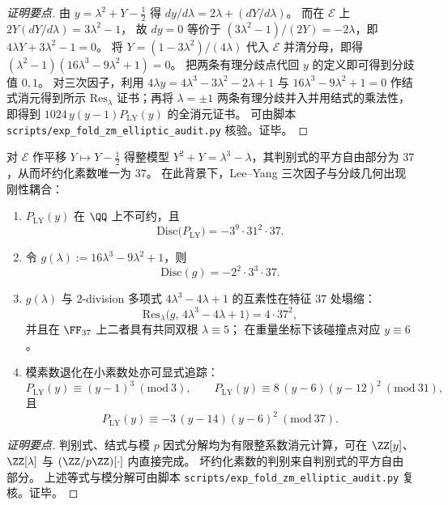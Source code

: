 \begin{proof}[证明要点]
由 \(y=\lambda^{2}+Y-\tfrac12\) 得
\(
dy/d\lambda=2\lambda+(dY/d\lambda)
\)。
而在 \(\mathcal{E}\) 上 \(2Y(dY/d\lambda)=3\lambda^{2}-1\)，
故 \(dy=0\) 等价于 \((3\lambda^{2}-1)/(2Y)=-2\lambda\)，即 \(4\lambda Y+3\lambda^{2}-1=0\)。
将 \(Y=(1-3\lambda^{2})/(4\lambda)\) 代入 \(\mathcal{E}\) 并清分母，即得
\(
(\lambda^{2}-1)(16\lambda^{3}-9\lambda^{2}+1)=0
\)。
把两条有理分歧点代回 \(y\) 的定义即可得到分歧值 \(0,1\)。
对三次因子，利用 \(4\lambda y=4\lambda^{3}-3\lambda^{2}-2\lambda+1\) 与 \(16\lambda^{3}-9\lambda^{2}+1=0\) 作结式消元得到所示 \(\mathrm{Res}_{\lambda}\) 证书；再将 \(\lambda=\pm 1\) 两条有理分歧并入并用结式的乘法性，即得到 \(1024\,y(y-1)P_{\mathrm{LY}}(y)\) 的全消元证书。
可由脚本 \texttt{scripts/exp\_fold\_zm\_elliptic\_audit.py} 核验。证毕。
\end{proof}



\begin{conclusion}\label{con:xi-terminal-zm-leyang-discriminant-bad-reduction-37}
对 \(\mathcal{E}\) 作平移 \(Y\mapsto Y-\tfrac12\) 得整模型
\(
Y^{2}+Y=\lambda^{3}-\lambda
\)，其判别式的平方自由部分为 \(37\)，从而坏约化素数唯一为 \(37\)。
在此背景下，Lee--Yang 三次因子与分歧几何出现刚性耦合：
\begin{enumerate}
  \item \(P_{\mathrm{LY}}(y)\) 在 \(\QQ\) 上不可约，且
  \[
  \mathrm{Disc}\bigl(P_{\mathrm{LY}}\bigr)=-3^{9}\cdot 31^{2}\cdot 37.
  \]
  \item 令 \(g(\lambda):=16\lambda^{3}-9\lambda^{2}+1\)，则
  \[
  \mathrm{Disc}(g)=-2^{2}\cdot 3^{3}\cdot 37.
  \]
  \item \(g(\lambda)\) 与 \(2\)-division 多项式 \(4\lambda^{3}-4\lambda+1\) 的互素性在特征 \(37\) 处塌缩：
  \[
  \mathrm{Res}_{\lambda}\bigl(g,\,4\lambda^{3}-4\lambda+1\bigr)=4\cdot 37^{2},
  \]
  并且在 \(\FF_{37}\) 上二者具有共同双根 \(\lambda\equiv 5\)；
  在重量坐标下该碰撞点对应 \(y\equiv 6\)。
  \item 模素数退化在小素数处亦可显式追踪：
  \[
  P_{\mathrm{LY}}(y)\equiv (y-1)^{3}\ (\mathrm{mod}\ 3),\qquad
  P_{\mathrm{LY}}(y)\equiv 8\,(y-6)(y-12)^{2}\ (\mathrm{mod}\ 31),
  \]
  且
  \[
  P_{\mathrm{LY}}(y)\equiv -3\,(y-14)(y-6)^{2}\ (\mathrm{mod}\ 37).
  \]
\end{enumerate}
\end{conclusion}
\begin{proof}[证明要点]
判别式、结式与模 \(p\) 因式分解均为有限整系数消元计算，可在 \(\ZZ[y]\)、\(\ZZ[\lambda]\) 与 \((\ZZ/p\ZZ)[\cdot]\) 内直接完成。
坏约化素数的判别来自判别式的平方自由部分。
上述等式与模分解可由脚本 \texttt{scripts/exp\_fold\_zm\_elliptic\_audit.py} 复核。证毕。
\end{proof}

